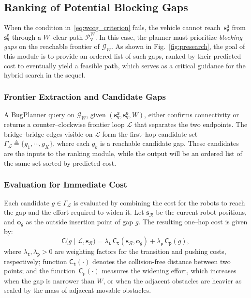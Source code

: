 \subsection{Ranking of Potential Blocking Gaps}\label{subsec:gap}

When the condition in~\eqref{eq:wccg_criterion} fails, the vehicle cannot
reach~$\mathbf{s}_\texttt{V}^{\texttt{G}}$ from
$\mathbf{s}_\texttt{V}^{\texttt{S}}$ through a $W$--clear path
$\mathcal{P}^W_\texttt{V}$. In this case, the planner must prioritize
\emph{blocking gaps} on the reachable frontier of $\mathcal{G}_W$.
As shown in Fig.~\ref{fig:presearch}, the goal of
this module is to provide an ordered list of such gaps, ranked by their
predicted cost to eventually yield a feasible path, which serves
as a critical guidance for the hybrid search in the sequel.

\subsubsection{Frontier Extraction and Candidate Gaps}
A BugPlanner query on $\mathcal{G}_W$, given
$(\mathbf{s}_\texttt{V}^{\texttt{S}},\mathbf{s}_\texttt{V}^{\texttt{G}},W)$,
either confirms connectivity or returns a counter--clockwise frontier loop
$\mathcal{L}$ that separates the two endpoints. The bridge--bridge edges
visible on $\mathcal{L}$ form the first--hop candidate set
$\Gamma_\mathcal{L}\triangleq\{g_1,\cdots,g_K\}$,
where each $g_k$ is a reachable candidate gap. These candidates are the inputs
to the ranking module, while the output will be an ordered list of the same
set sorted by predicted cost.

\subsubsection{Evaluation for Immediate Cost}
Each candidate $g\in\Gamma_\mathcal{L}$ is evaluated by combining the
cost for the robots to reach the gap and the effort required to widen it.
Let $\mathbf{s}_{\mathcal{R}}$ be the current robot positions,
and $\mathbf{o}_g$ as the outside insertion point of gap $g$. The
resulting one--hop cost is given by:
\begin{equation}\label{eq:step_cost}
\mathsf{C}\big(g \mid \mathcal{L}, \mathbf{s}_{\mathcal{R}}\big)
=\lambda_\texttt{t}\,\mathsf{C}_\texttt{t}\!\left(\mathbf{s}_{\mathcal{R}},\mathbf{o}_g\right)
+\lambda_\texttt{p}\,\mathsf{C}_\texttt{p}(g),
\end{equation}
where $\lambda_\texttt{t},\lambda_\texttt{p}>0$ are weighting factors
for the transition and pushing costs, respectively;
function $\mathsf{C}_\texttt{t}(\cdot)$ denotes the collision-free
distance between two points;
and the function~$\mathsf{C}_\texttt{p}(\cdot)$ measures the widening effort,
which increases when the gap is narrower than $W$,
or when the adjacent obstacles are heavier as scaled by the  mass of adjacent movable
obstacles.



